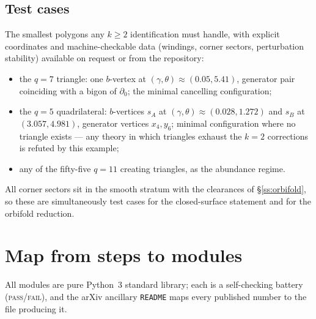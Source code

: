 \documentclass[11pt,reqno]{amsart}
\theoremstyle{plain}
\theoremstyle{definition}
\newcommand{\bc}{b}
\begin{document}
\subsection{Test cases}\label{ss:tests}
The smallest polygons any $k\ge2$ identification must handle, with explicit coordinates and
machine-checkable data (windings, corner sectors, perturbation stability) available on
request or from the repository:
\begin{itemize}
\item the $q=7$ triangle: one $\bc$-vertex at $(\gamma,\theta)\approx(0.05,5.41)$, generator pair
coinciding with a bigon of $\partial_0$; the minimal cancelling configuration;
\item the $q=5$ quadrilateral: $\bc$-vertices $s_A$ at $(\gamma,\theta)\approx(0.028,1.272)$
and $s_B$ at $(3.057,4.981)$, generator vertices $x_4,y_6$; minimal configuration where no
triangle exists --- any theory in which triangles exhaust the $k=2$ corrections is refuted by
this example;
\item any of the fifty-five $q=11$ creating triangles, as the abundance regime.
\end{itemize}
All corner sectors sit in the smooth stratum with the clearances of \S\ref{ss:orbifold}, so
these are simultaneously test cases for the closed-surface statement and for the orbifold
reduction.

\appendix

\section{Map from steps to modules}\label{app:files}
All modules are pure Python~3 standard library; each is a self-checking battery
(\textsc{pass/fail}), and the arXiv ancillary \texttt{README} maps every published number to
the file producing it.
\end{document}
